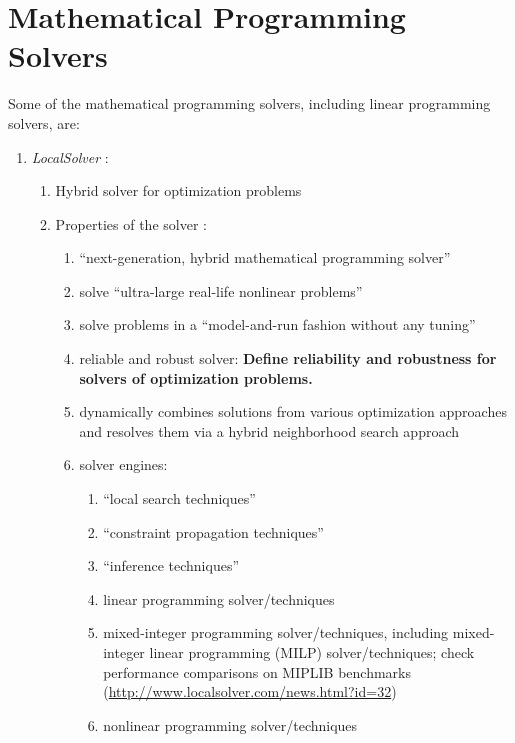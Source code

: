 \section{Mathematical Programming Solvers}
\label{sec:MathematicalProgrammingSolvers}

Some of the mathematical programming solvers, including linear programming solvers, are: \vspace{-0.3cm}
\begin{enumerate} \itemsep -4pt
\item {\it LocalSolver} \cite{Innovation24Staff2015}: \vspace{-0.3cm}
	\begin{enumerate} \itemsep -2pt
	\item Hybrid solver for optimization problems
	\item Properties of the solver \cite[Product: Overview]{Innovation24Staff2015}: \vspace{-0.2cm}
		\begin{enumerate} \itemsep -2pt
		\item ``next-generation, hybrid mathematical programming solver''
		\item solve ``ultra-large real-life nonlinear problems''
		\item solve problems in a ``model-and-run fashion without any tuning''
		\item reliable and robust solver: {\bf Define reliability and robustness for solvers of optimization problems.}
		\item dynamically combines solutions from various optimization approaches and resolves them via a hybrid neighborhood search approach
		\item solver engines: \vspace{-0.1cm}
			\begin{enumerate} \itemsep -1pt
			\item ``local search techniques''
			\item ``constraint propagation techniques''
			\item ``inference techniques''
			\item linear programming solver/techniques
			\item mixed-integer programming solver/techniques, including mixed-integer linear programming (MILP) solver/techniques; check performance comparisons on {MIPLIB} benchmarks (\url{http://www.localsolver.com/news.html?id=32})
			\item nonlinear programming solver/techniques

\end{enumerate}
\end{enumerate}
\end{enumerate}
\end{enumerate}
